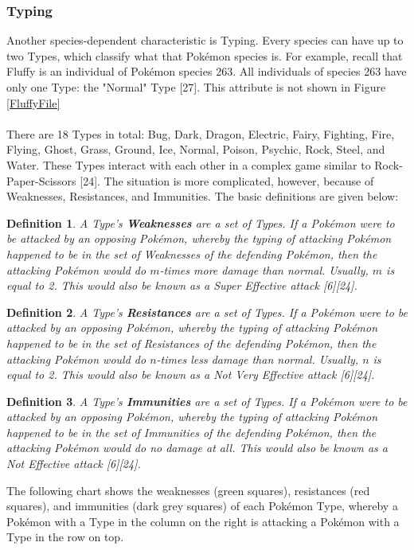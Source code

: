 \documentclass{article}
\newtheorem*{definition*}{Definition}
\begin{document}
\subsubsection{Typing}
Another species-dependent characteristic is Typing. Every species can have up to two Types, which classify what that Pok\'emon species is. For example, recall that Fluffy is an individual of Pok\'emon species 263. All individuals of species 263 have only one Type: the "Normal" Type [27]. This attribute is not shown in Figure \ref{FluffyFile}\\\\
There are 18 Types in total: Bug, Dark, Dragon, Electric, Fairy, Fighting, Fire, Flying, Ghost, Grass, Ground, Ice, Normal, Poison, Psychic, Rock, Steel, and Water. These Types interact with each other in a complex game similar to Rock-Paper-Scissors [24]. The situation is more complicated, however, because of Weaknesses, Resistances, and Immunities. The basic definitions are given below:
\begin{definition*}
	A Type's \textbf{Weaknesses} are a set of Types. If a Pok\'emon were to be attacked by an opposing Pok\'emon, whereby the typing of attacking Pok\'emon happened to be in the set of Weaknesses of the defending Pok\'emon, then the attacking Pok\'emon would do $m$-times more damage than normal. Usually, $m$ is equal to 2. This would also be known as a Super Effective attack [6][24].
\end{definition*}
\begin{definition*}
	A Type's \textbf{Resistances} are a set of Types. If a Pok\'emon were to be attacked by an opposing Pok\'emon, whereby the typing of attacking Pok\'emon happened to be in the set of Resistances of the defending Pok\'emon, then the attacking Pok\'emon would do $n$-times less damage than normal. Usually, $n$ is equal to 2. This would also be known as a Not Very Effective attack [6][24].
\end{definition*}
\begin{definition*}
	A Type's \textbf{Immunities} are a set of Types. If a Pok\'emon were to be attacked by an opposing Pok\'emon, whereby the typing of attacking Pok\'emon happened to be in the set of Immunities of the defending Pok\'emon, then the attacking Pok\'emon would do no damage at all. This would also be known as a Not Effective attack [6][24].
\end{definition*}
The following chart shows the weaknesses (green squares), resistances (red squares), and immunities (dark grey squares) of each Pok\'emon Type, whereby a Pok\'emon with a Type in the column on the right is attacking a Pok\'emon with a Type in the row on top.
\end{document}
